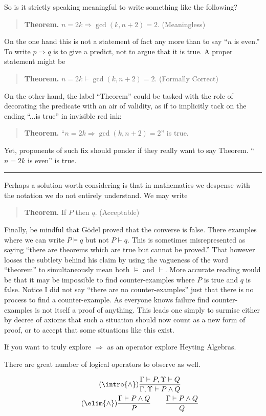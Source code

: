 \begin{remark}
    So is it strictly speaking meaningful to write something like the 
    following? 
    \begin{quote}
        \textbf{Theorem.} $n=2k\Rightarrow \gcd(k,n+2)=2$.
        \hfill{\color{BrickRed} (Meaningless)}
    \end{quote}
    On the one hand this is not a statement of fact any more than 
    to say ``$n$ is even.''  To write $p\Rightarrow q$ is to give 
    a predict, not to argue that it is true.  A proper statement 
    might be 
    \begin{quote}
        \textbf{Theorem.} $n=2k\vdash \gcd(k,n+2)=2$.
        \hfill{\color{BrickRed} (Formally Correct)}
    \end{quote}

    On the other hand, the label ``Theorem'' could be tasked with the 
    role of decorating the predicate with an air of validity, as if 
    to implicitly tack on the ending ``...is true'' in invisible red ink:
    \begin{quote}
        \textbf{Theorem.} ``$n=2k\Rightarrow \gcd(k,n+2)=2$'' {\color{BrickRed} is true.}
    \end{quote}
    Yet, proponents of such fix should ponder if they really want to say
    Theorem. ``$n=2k$ is even'' is true.

    \noindent\rule{\textwidth}{1pt}
    Perhaps a solution worth considering is that in mathematics we 
    despense with the notation we do not entirely understand.  We may write 
    \begin{quote}
        \textbf{Theorem.} If $P$  then $q$.
        \hfill{\color{BrickRed} (Acceptable)}
    \end{quote}
\end{remark}
Finally, be mindful that G\"odel proved that the converse is false.  There
examples where we can write $P\vDash q$ but not $P\vdash q$.   This is sometimes
misrepresented as saying ``there are theorems which are true but cannot be
proved.'' That however looses the subtlety behind his claim by using the
vagueness of the word ``theorem'' to simultaneously mean both $\vDash$ and
$\vdash$.  More accurate reading would be that it may be impossible to find
counter-examples where $P$ is true and $q$ is false. Notice I did not say
``there are no counter-examples'' just that there is no process to find a
counter-example.  As everyone knows failure find counter-examples is not itself
a proof of anything. This leads one simply to surmise either by decree of axioms 
that such a situation should now count as a new form of proof, or to accept that 
some situations like this exist.

If you want to truly explore $\Rightarrow$ as an operator explore Heyting Algebras.


There are great number of logical operators to observe as well.

\begin{gather}
    \tag{$\intro{\wedge}$}
    \frac{\Gamma \vdash P, \Upsilon \vdash Q}{\Gamma, \Upsilon \vdash P\wedge Q}\\
    \tag{$\elim{\wedge}$}
    \frac{\Gamma \vdash P\wedge Q}{P}
    \qquad
    \frac{\Gamma \vdash P\wedge Q}{Q}
\end{gather}